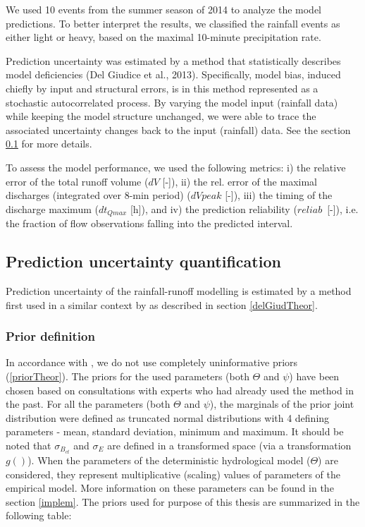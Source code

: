 \documentclass{ctuthesis}\usepackage[]{graphicx}\usepackage[]{color}
\begin{document}
We used 10 events from the summer season of 2014 to analyze the model predictions. To better interpret the results, we classified the rainfall events as either light or heavy, based on the maximal 10-minute precipitation rate. 

Prediction uncertainty was estimated by a method that statistically describes model deficiencies (Del Giudice et al., 2013). Specifically, model bias, induced chiefly by input and structural errors, is in this method represented as a stochastic autocorrelated process. By varying the model input (rainfall data) while keeping the model structure unchanged, we were able to trace the associated uncertainty changes back to the input (rainfall) data. See the section \ref{paperIUnc} for more details.

To assess the model performance, we used the following metrics: i) the relative error of the total runoff volume ($dV$ [-]), ii) the rel. error of the maximal discharges (integrated over 8-min period) ($dVpeak$ [-]), iii) the timing of the discharge maximum ($dt_{Qmax}$ [h]), and iv) the prediction reliability ($reliab$~[-]), i.e. the fraction of flow observations falling into the predicted interval.



\subsection{Prediction uncertainty quantification} \label{paperIUnc}

Prediction uncertainty of the rainfall-runoff modelling is estimated by a method first used in a similar context by \cite{giudice2013improving} as described in section \ref{delGiudTheor}.


\subsubsection{Prior definition}
In accordance with \cite{giudice2013improving}, we do not use  completely uninformative priors  (\ref{priorTheor}). The priors for the used parameters (both $\Theta$ and  $\psi$) have been chosen based on consultations with experts who had already used the method in the past. For all the parameters (both $\Theta$ and $\psi$), the marginals of the prior joint distribution were defined as truncated normal distributions with 4 defining parameters - mean, standard deviation, minimum and maximum. It should be noted that  $\sigma_{B_{ct}}$ and  $\sigma_E$ are defined in a transformed space (via a transformation $g()$).  When the parameters of the deterministic hydrological model ($\Theta$) are considered, they represent multiplicative (scaling) values of  parameters of the empirical model. More information on these parameters can be found in the section \ref{implem}. The priors used for purpose of this thesis are summarized in the following table:
\end{document}
